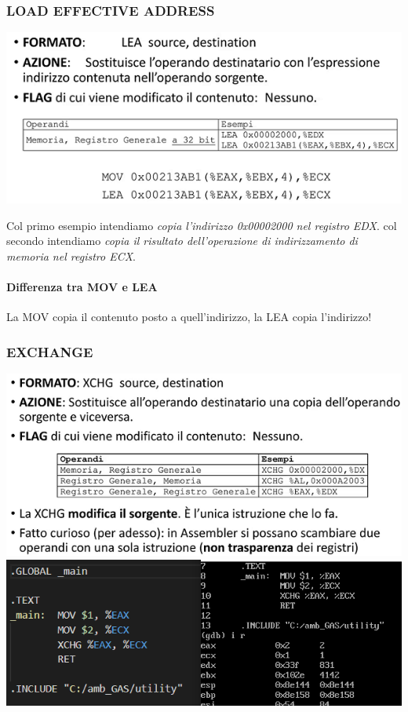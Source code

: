 \documentclass[11pt]{report}
\begin{document}
\subsubsection{LOAD EFFECTIVE ADDRESS}
\begin{center}
\includegraphics{img/8.PNG}
\end{center}
Col primo esempio intendiamo \emph{copia l'indirizzo 0x00002000 nel registro EDX}. col secondo intendiamo \emph{copia il risultato dell'operazione di indirizzamento di memoria nel registro ECX}. 
\paragraph{Differenza tra MOV e LEA} La MOV copia il contenuto posto a quell'indirizzo, la LEA copia l'indirizzo!

\subsubsection{EXCHANGE}
\begin{center}
\includegraphics{img/9.PNG}
\includegraphics{img/215.PNG}
\end{center}
\end{document}
